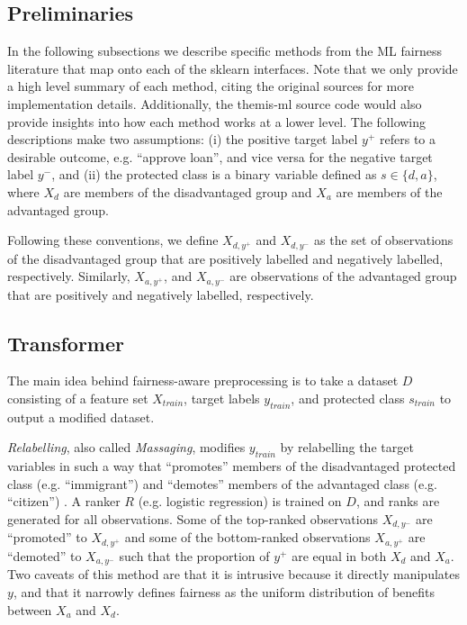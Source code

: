 \documentclass[man,natbib]{apa6}
\begin{document}
\subsection{Preliminaries} In the following subsections we describe specific
methods from the ML fairness literature that map onto each of the sklearn
interfaces. Note that we only provide a high level summary of each method,
citing the original sources for more implementation details. Additionally, the
themis-ml source code would also provide insights into how each method works at
a lower level. The following descriptions make two assumptions: (i) the positive
target label \(y^{+}\) refers to a desirable outcome, e.g. ``approve loan'', and
vice versa for the negative target label \(y^{-}\), and (ii) the protected class
is a binary variable defined as \(s \in \{d, a\}\), where \(X_d\)  are members
of the disadvantaged group and \(X_a\) are members of the advantaged group.

Following these conventions, we define \(X_{d, y^{+}}\) and \(X_{d, y^{-}}\)
as the set of observations of the disadvantaged group that are positively
labelled and negatively labelled, respectively. Similarly, \(X_{a, y^{+}}\), and
\(X_{a, y^{-}}\)  are observations of the advantaged group that are positively
and negatively labelled, respectively.

\subsection{Transformer} The main idea behind fairness-aware preprocessing is to
take a dataset \(D\) consisting of a feature set \(X_{train}\), target labels
\(y_{train}\), and protected class \(s_{train}\) to output a modified dataset.

\emph{Relabelling}, also called \emph{Massaging}, modifies \(y_{train}\) by relabelling
the target variables in such a way that ``promotes'' members of the
disadvantaged protected class (e.g. ``immigrant'') and ``demotes'' members of
the advantaged class (e.g. ``citizen'') \cite{kamiran2012data}. A ranker \(R\)
(e.g. logistic regression) is trained on \(D\), and ranks are generated for
all observations. Some of the top-ranked observations \(X_{d, y^{-}}\)  are
``promoted'' to \(X_{d, y^{+}}\) and some of the bottom-ranked observations
\(X_{a, y^{+}}\)  are ``demoted'' to \(X_{a, y^{-}}\) such that the proportion
of \(y^{+}\) are equal in both \(X_d\) and \(X_a\). Two caveats of this method
are that it is intrusive because it directly manipulates \(y\), and that it
narrowly defines fairness as the uniform distribution of benefits between
\(X_a\) and \(X_d\).
\end{document}
